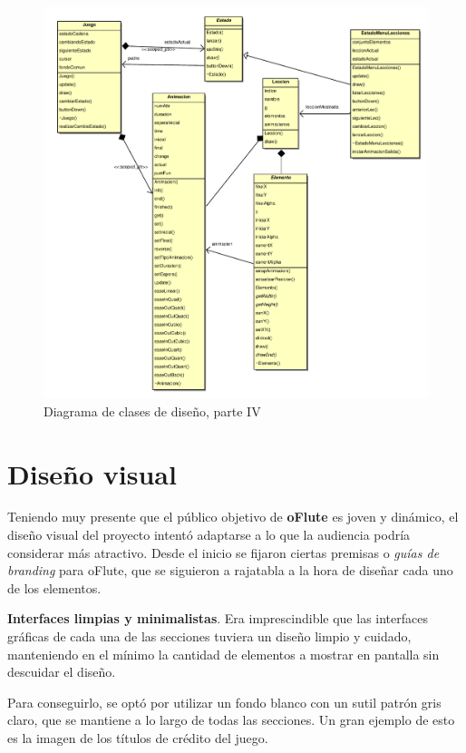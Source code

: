 \begin{figure}[htp!]
  \centering
  \includegraphics[width=\textwidth, clip=true, trim=0cm 0cm 0cm 0cm]{5_diseno/diagrama4}
  \caption{Diagrama de clases de diseño, parte IV}
  \label{fig:diagrama_clases_4}
\end{figure}

\section{Diseño visual}
Teniendo muy presente que el público objetivo de \textbf{oFlute} es joven y
dinámico, el diseño visual del proyecto intentó adaptarse a lo que la audiencia
podría considerar más atractivo. Desde el inicio se fijaron ciertas premisas o
\textit{guías de branding} para oFlute, que se siguieron a rajatabla a la hora
de diseñar cada uno de los elementos.

\textbf{Interfaces limpias y minimalistas}. Era imprescindible que las
interfaces gráficas de cada una de las secciones tuviera un diseño limpio y
cuidado, manteniendo en el mínimo la cantidad de elementos a mostrar en pantalla
sin descuidar el diseño.

Para conseguirlo, se optó por utilizar un fondo blanco con un sutil patrón gris
claro, que se mantiene a lo largo de todas las secciones. Un gran ejemplo de esto
es la imagen de los títulos de crédito del juego.

